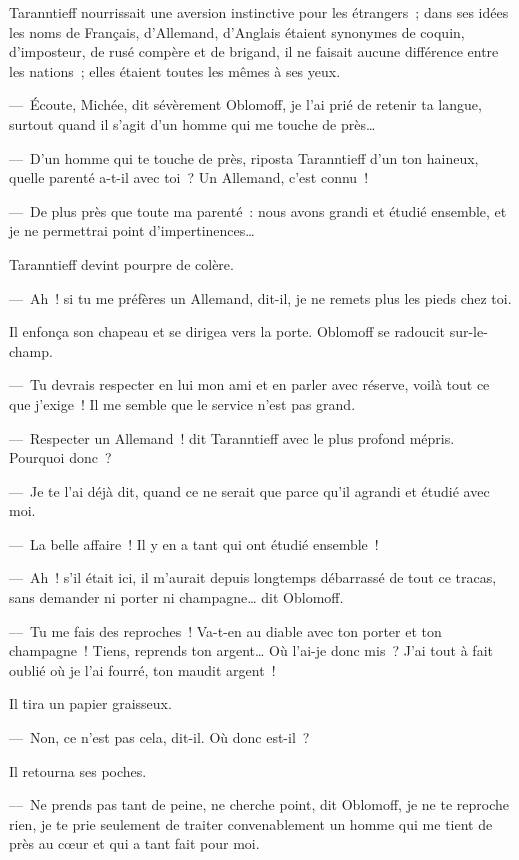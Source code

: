 \documentclass[french,twoside]{book} %
\begin{document}
Taranntieff nourrissait une aversion instinctive pour les étrangers ; dans ses idées les noms de Français, d’Allemand, d’Anglais étaient synonymes de coquin, d’imposteur, de rusé compère et de brigand, il ne faisait aucune différence entre les nations ; elles étaient toutes les mêmes à ses yeux.\par
— Écoute, Michée, dit sévèrement Oblomoff, je l’ai prié de retenir ta langue, surtout quand il s’agit d’un homme qui me touche de près…\par
— D’un homme qui te touche de près, riposta Taranntieff d’un ton haineux, quelle parenté a-t-il avec toi ? Un Allemand, c’est connu !\par
— De plus près que toute ma parenté : nous avons grandi et étudié ensemble, et je ne permettrai point d’impertinences…\par
Taranntieff devint pourpre de colère.\par
— Ah ! si tu me préfères un Allemand, dit-il, je ne remets plus les pieds chez toi.\par
Il enfonça son chapeau et se dirigea vers la porte. Oblomoff se radoucit sur-le-champ.\par
— Tu devrais respecter en lui mon ami et en parler avec réserve, voilà tout ce que j’exige ! Il me semble que le service n’est pas grand.\par
— Respecter un Allemand ! dit Taranntieff avec le plus profond mépris. Pourquoi donc ?\par
— Je te l’ai déjà dit, quand ce ne serait que parce qu’il agrandi et étudié avec moi.\par
— La belle affaire ! Il y en a tant qui ont étudié ensemble !\par
— Ah ! s’il était ici, il m’aurait depuis longtemps débarrassé de tout ce tracas, sans demander ni porter ni champagne… dit Oblomoff.\par
— Tu me fais des reproches ! Va-t-en au diable avec ton porter et ton champagne ! Tiens, reprends ton argent… Où l’ai-je donc mis ? J’ai tout à fait oublié où je l’ai fourré, ton maudit argent !\par
Il tira un papier graisseux.\par
— Non, ce n’est pas cela, dit-il. Où donc est-il ?\par
Il retourna ses poches.\par
— Ne prends pas tant de peine, ne cherche point, dit Oblomoff, je ne te reproche rien, je te prie seulement de traiter convenablement un homme qui me tient de près au cœur et qui a tant fait pour moi.\par
\end{document}
